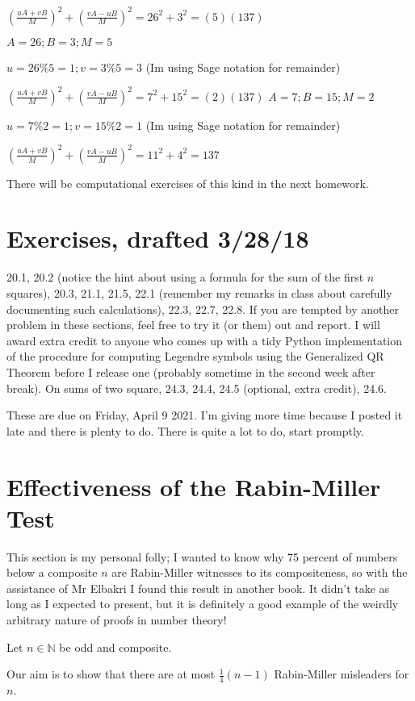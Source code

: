 \documentclass[12pt]{article}
\begin{document}
$(\frac{uA+vB}M)^2+(\frac{vA-uB}M)^2= 26^2+3^2=(5)(137)$

$A=26; B=3; M=5$

$u=26\%5=1; v=3\%5=3$  (Im using Sage notation for remainder)

$(\frac{uA+vB}M)^2+(\frac{vA-uB}M)^2= 7^2+15^2=(2)(137)$
$A=7; B=15; M=2$

$u=7\%2=1; v=15\%2=1$  (Im using Sage notation for remainder)

$(\frac{uA+vB}M)^2+(\frac{vA-uB}M)^2= 11^2+4^2=137$

There will be computational exercises of this kind in the next homework.

\section{Exercises, drafted 3/28/18}

20.1, 20.2 (notice the hint about using a formula for the sum of the first $n$ squares), 20.3, 21.1, 21.5, 22.1 (remember my remarks in class about carefully documenting such calculations), 22.3, 22.7, 22.8.   If you are tempted by another problem in these sections, feel free to try it (or them) out and report.  I will award extra credit to anyone who comes up with a tidy Python implementation of the procedure for computing Legendre symbols using the Generalized QR Theorem before I release one (probably sometime in the second week after break).  On sums of two square, 24.3, 24.4, 24.5 (optional, extra credit), 24.6.

These are due on Friday,  April 9 2021.  I'm giving more time because I posted it late and there is plenty to do.  There is quite a lot to do, start promptly.

\section{Effectiveness of the Rabin-Miller Test}

This section is my personal folly; I wanted to know why 75 percent of numbers below a composite $n$ are Rabin-Miller witnesses to its compositeness, so with the assistance of Mr Elbakri I found this result in another book.   It didn't take as long as I expected to present, but it is definitely a good example of the weirdly arbitrary nature of proofs in number theory!

Let $n \in {\mathbb N}$ be odd and composite.

Our aim is to show that there are at most $\frac14(n-1)$ Rabin-Miller misleaders for $n$.
\end{document}
